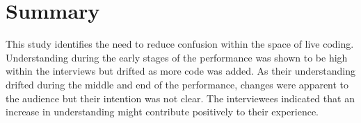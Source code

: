 \section{Summary}

This study identifies the need to reduce confusion within the space of live coding. Understanding during the early stages of the performance was shown to be high within the interviews but drifted as more code was added. As their understanding drifted during the middle and end of the performance, changes were apparent to the audience but their intention was not clear. The interviewees indicated that an increase in understanding might contribute positively to their experience.



